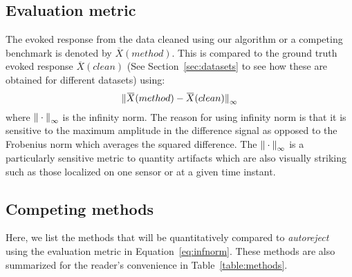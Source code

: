 \subsection{Evaluation metric}
The evoked response from the data cleaned using our algorithm or a competing benchmark is denoted by $\overbar{X}(method)$. This is compared to the ground truth evoked response $\overbar{X}(clean)$ (See Section~\ref{sec:datasets} to see how these are obtained for different datasets) using:
%
\begin{equation}
\infnorm{\overbar{X}(method) - \overbar{X}(clean)}
\label{eq:infnorm}
\end{equation}
%
where ${\| \cdot \|}_{\mathrm{\infty}}$ is the infinity norm. The reason for using infinity norm is that it is sensitive to the maximum amplitude in the difference signal as opposed to the Frobenius norm which averages the squared difference. The ${\| \cdot \|}_{\mathrm{\infty}}$ is a particularly sensitive metric to quantity artifacts which are also visually striking such as those localized on one sensor or at a given time instant.

\subsection{Competing methods}
\label{sec:competing_methods}

Here, we list the methods that will be quantitatively compared to \emph{autoreject} using the evaluation metric in Equation~\ref{eq:infnorm}. These methods are also summarized for the reader's convenience in Table~\ref{table:methods}.

